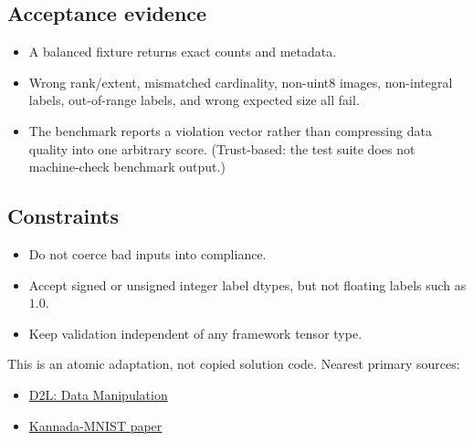         \subsection{Acceptance evidence}

        \begin{evidencebox}
        \begin{itemize}
          \item A balanced fixture returns exact counts and metadata.
  \item Wrong rank/extent, mismatched cardinality, non-uint8 images, non-integral labels, out-of-range labels, and wrong expected size all fail.
  \item The benchmark reports a violation vector rather than compressing data quality into one arbitrary score. (Trust-based: the test suite does not machine-check benchmark output.)
        \end{itemize}
        \end{evidencebox}

        \subsection{Constraints}

        \begin{itemize}
          \item Do not coerce bad inputs into compliance.
  \item Accept signed or unsigned integer label dtypes, but not floating labels such as $1.0$.
  \item Keep validation independent of any framework tensor type.
        \end{itemize}

        \begin{sourcebox}
        This is an atomic adaptation, not copied solution code. Nearest primary sources:
        \begin{itemize}
          \item \href{https://d2l.ai/chapter_preliminaries/ndarray.html}{D2L: Data Manipulation}
  \item \href{https://arxiv.org/abs/1908.01242}{Kannada-MNIST paper}
        \end{itemize}
        \end{sourcebox}
